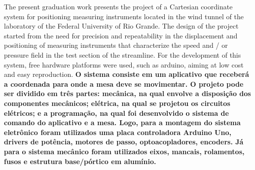 The present graduation work presents the project of a Cartesian coordinate system for positioning 
measuring instruments located in the wind tunnel of the laboratory of the Federal University of 
Rio Grande. The design of the project started from the need for precision and repeatability in 
the displacement and positioning of measuring instruments that characterize the speed and / or pressure 
field in the test section of the streamline. For the development of this system, free hardware platforms 
were used, such as arduino, aiming at low cost and easy reproduction. \textbf{O sistema consiste em um aplicativo 
que receberá a coordenada para onde a mesa deve se movimentar. O projeto pode ser dividido em três partes: 
mecânica, na qual envolve a disposição dos componentes mecânicos; elétrica, na qual se projetou os 
circuitos elétricos; e a programação, na qual foi desenvolvido o sistema de comando do aplicativo e 
a mesa. Logo, para a montagem do sistema eletrônico foram utilizados uma placa controladora 
Arduino Uno, drivers de potência, motores de passo, optoacopladores, encoders. Já para o sistema 
mecânico foram utilizados eixos, mancais, rolamentos, fusos e  estrutura base/pórtico em alumínio.}

